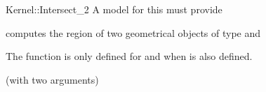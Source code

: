 \begin{ccRefFunctionObjectConcept}{Kernel::Intersect_2}
A model for this must provide


{computes the  region of two geometrical objects of type 
 and }

The function is only defined for  and 
when  is also defined.

\ccRefines
{} (with two arguments)

\ccSeeAlso
{}\\

\end{ccRefFunctionObjectConcept}
